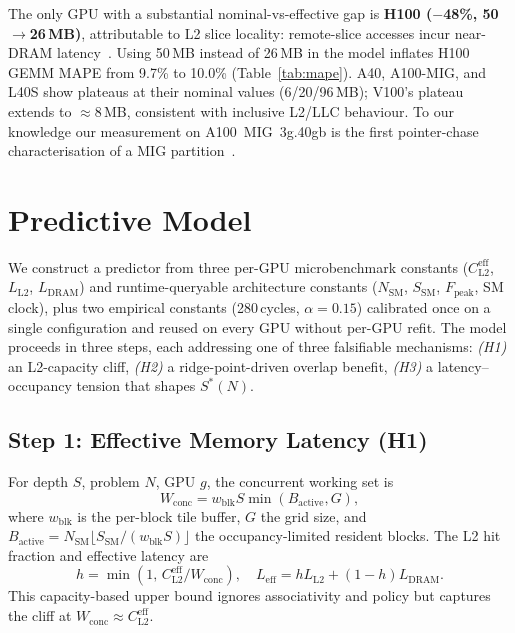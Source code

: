 \documentclass[10pt,twocolumn]{article}
\newcommand{\wconc}{W_{\text{conc}}}
\newcommand{\cleff}{C_{\text{L2}}^{\text{eff}}}
\newcommand{\Leff}{L_{\text{eff}}}
\newcommand{\LLtwo}{L_{\text{L2}}}
\newcommand{\Ldram}{L_{\text{DRAM}}}
\begin{document}
The only GPU with a substantial nominal-vs-effective gap is
\textbf{H100 ($-$48\%, 50$\to$26\,MB)}, attributable to L2 slice
locality: remote-slice accesses incur near-DRAM
latency~\cite{hopper_ieee,gpu_noc}.  Using 50\,MB instead of 26\,MB
in the model inflates H100 GEMM MAPE from 9.7\% to 10.0\%
(Table~\ref{tab:mape}).  A40, A100-MIG, and L40S show plateaus at their nominal values
(6/20/96\,MB); V100's plateau extends to $\approx$8\,MB, consistent
with inclusive L2/LLC behaviour.  To our knowledge our measurement
on A100~MIG~3g.40gb is the first pointer-chase characterisation of
a MIG partition~\cite{mig_guide}.

\section{Predictive Model}
\label{sec:model}

We construct a predictor from three per-GPU microbenchmark
constants ($\cleff$, $\LLtwo$, $\Ldram$) and runtime-queryable
architecture constants ($N_{\text{SM}}$, $S_{\text{SM}}$,
$F_{\text{peak}}$, SM clock), plus two empirical constants
(280\,cycles, $\alpha{=}0.15$) calibrated once on a single
configuration and reused on every GPU without per-GPU refit.  The
model proceeds in three steps, each addressing one of three
falsifiable mechanisms: \emph{(H1)} an L2-capacity cliff,
\emph{(H2)} a ridge-point-driven overlap benefit, \emph{(H3)} a
latency--occupancy tension that shapes $S^*(N)$.

\subsection{Step 1: Effective Memory Latency (H1)}

For depth $S$, problem $N$, GPU $g$, the concurrent working set is
\begin{equation}
  \wconc = w_{\text{blk}} S \min(B_{\text{active}}, G),
\end{equation}
where $w_{\text{blk}}$ is the per-block tile buffer, $G$ the grid
size, and $B_{\text{active}} = N_{\text{SM}} \lfloor S_{\text{SM}} /
(w_{\text{blk}} S) \rfloor$ the occupancy-limited resident blocks.
The L2 hit fraction and effective latency are
\begin{equation}
  h = \min(1,\, \cleff/\wconc), \quad
  \Leff = h \LLtwo + (1-h) \Ldram.
\end{equation}
This capacity-based upper bound ignores associativity and policy
but captures the cliff at $\wconc \approx \cleff$.
\end{document}
